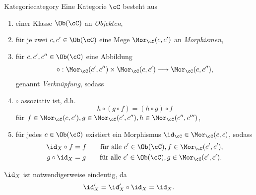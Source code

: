 \documentclass[language=ngerman]{TemplateLecture} %
\begin{document}
\begin{defi}{Kategorie}{category}
    Eine Kategorie $\cC$ besteht aus
    \begin{enumerate}[$(i)$]
        \item einer Klasse $\Ob(\cC)$ an \emph{Objekten},
        \item für je zwei $c,c' \in \Ob(\cC)$ eine Mege $\Mor_\cC(c, c')$ an \emph{Morphismen},
        \item für $c, c', c'' \in \Ob(\cC)$ eine Abbildung 
        \begin{equation*}
            \circ: \Mor_\cC(c', c'') \times \Mor_\cC(c,c') \longrightarrow \Mor_\cC(c,c''),
        \end{equation*}
        genannt \emph{Verknüpfung}, sodass
        \item $\circ$ assoziativ ist, d.h.
        \begin{equation*}
            h \circ (g \circ f) = (h \circ g) \circ f
        \end{equation*}
        für $f \in \Mor_\cC(c,c'), g \in \Mor_\cC(c',c''), h \in \Mor_\cC(c'',c''')$,
        \item für jedes $c \in \Ob(\cC)$ existiert ein Morphismus $\id_\cC \in \Mor_\cC(c,c)$, sodass 
        \begin{align*}
            \id_X \circ f &= f \quad \quad \text{für alle $c' \in \Ob(\cC), f \in \Mor_\cC(c', c')$}, \\
            g \circ \id_X &= g \quad \quad \text{für alle $c' \in \Ob(\cC), g \in \Mor_\cC(c', c')$}.
        \end{align*}
    \end{enumerate}
\end{defi}
\begin{remark}
    $\id_X$ ist notwendigerweise eindeutig, da 
    \begin{equation*}
        \id_X' = \id_X' \circ \id_X = \id_X.
    \end{equation*}
\end{remark}
\end{document}
